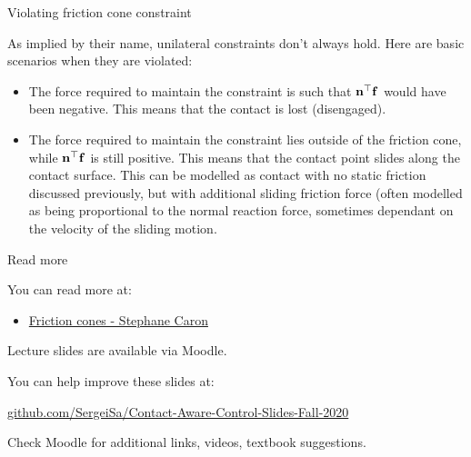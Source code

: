 \documentclass{beamer}
\begin{document}
\begin{frame}{Violating friction cone constraint}
\begin{flushleft}

As implied by their name, unilateral constraints don't always hold. Here are basic scenarios when they are violated:

\begin{itemize}
    \item The force required to maintain the constraint is such that $\mathbf{n}^\top \mathbf{f}$ would have been negative. This means that the contact is lost (disengaged).
    \item The force required to maintain the constraint lies outside of the friction cone, while $\mathbf{n}^\top \mathbf{f}$ is still positive. This means that the contact point slides along the contact surface. This can be modelled as contact with no static friction discussed previously, but with  additional sliding friction force (often modelled as being proportional to the normal reaction force, sometimes dependant on the velocity of the sliding motion.
\end{itemize}

\end{flushleft}
\end{frame}



\begin{frame}{Read more}
\begin{flushleft}

You can read more at:

\begin{itemize}
    \item \href{https://scaron.info/teaching/friction-cones.html}{Friction cones - Stephane Caron}
\end{itemize}

\end{flushleft}
\end{frame}




\begin{frame}
\centerline{Lecture slides are available via Moodle.}
\bigskip
\centerline{You can help improve these slides at:}
\centerline{\href{https://github.com/SergeiSa/Contact-Aware-Control-Slides-Fall-2020}{github.com/SergeiSa/Contact-Aware-Control-Slides-Fall-2020}}
\bigskip
\centerline{Check Moodle for additional links, videos, textbook suggestions.}
\end{frame}
\end{document}
